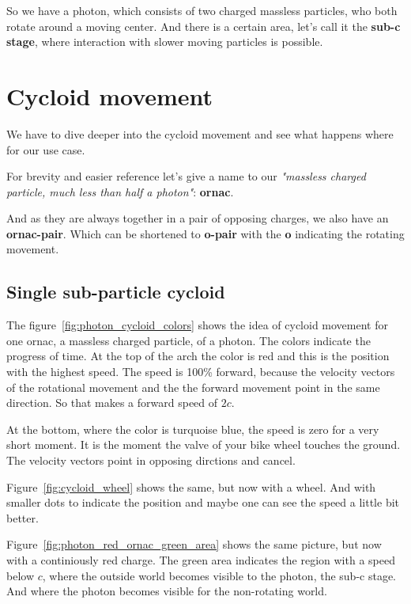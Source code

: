 So we have a photon, which consists of two charged massless particles, who both rotate around a moving center. And there is a certain area, let's call it the \textbf{sub-c stage}, where interaction with slower moving particles is possible.

\section{Cycloid movement}

We have to dive deeper into the cycloid movement and see what happens where for our use case.

For brevity and easier reference let's give a name to our \emph{"massless charged particle, much less than half a photon"}: \textbf{ornac}.

And as they are always together in a pair of opposing charges, we also have an \textbf{ornac-pair}. Which can be shortened to \textbf{o-pair} with the \textbf{o} indicating the rotating movement.

\subsection{Single sub-particle cycloid}



The figure~\vref{fig:photon_cycloid_colors}  shows the idea of cycloid movement for one ornac, a massless charged particle, of a photon. The colors indicate the progress of time. At the top of the arch the color is red and this is the position with the highest speed. The speed is 100\% forward, because the velocity vectors of the rotational movement and the the forward movement point in the same direction. So that makes a forward speed of $2c$.

At the bottom, where the color is turquoise blue, the speed is zero for a very short moment. It is the moment the valve of your bike wheel touches the ground. The velocity vectors point in opposing dirctions and cancel.



Figure~\vref{fig:cycloid_wheel} shows the same, but now with a wheel. And with smaller dots to indicate the position and maybe one can see the speed a little bit better.




Figure~\vref{fig:photon_red_ornac_green_area} shows the same picture, but now with a continiously red charge. The green area indicates the region with a speed below $c$, where the outside world becomes visible to the photon, the sub-c stage. And where the photon becomes visible for the non-rotating world.


